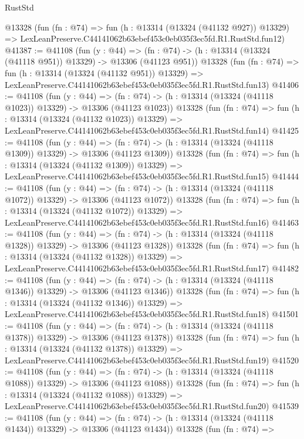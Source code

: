 \begin{lexlean}{RustStd}
\begin{coremodule}
    @13328
    (fun (fn : @74) =>
    fun (h : @13314 (@13324 (@41132 @927)) @13329) =>
    LexLeanPreserve.C44141062b63ebef453c0eb035f3ec5fd.R1.RustStd.fun12)
@41387 := @41108
    (fun (y : @44) =>
    (fn : @74) -> (h : @13314 (@13324 (@41118 @951)) @13329) -> @13306 (@41123 @951))
    @13328
    (fun (fn : @74) =>
    fun (h : @13314 (@13324 (@41132 @951)) @13329) =>
    LexLeanPreserve.C44141062b63ebef453c0eb035f3ec5fd.R1.RustStd.fun13)
@41406 := @41108
    (fun (y : @44) =>
    (fn : @74) -> (h : @13314 (@13324 (@41118 @1023)) @13329) -> @13306 (@41123 @1023))
    @13328
    (fun (fn : @74) =>
    fun (h : @13314 (@13324 (@41132 @1023)) @13329) =>
    LexLeanPreserve.C44141062b63ebef453c0eb035f3ec5fd.R1.RustStd.fun14)
@41425 := @41108
    (fun (y : @44) =>
    (fn : @74) -> (h : @13314 (@13324 (@41118 @1309)) @13329) -> @13306 (@41123 @1309))
    @13328
    (fun (fn : @74) =>
    fun (h : @13314 (@13324 (@41132 @1309)) @13329) =>
    LexLeanPreserve.C44141062b63ebef453c0eb035f3ec5fd.R1.RustStd.fun15)
@41444 := @41108
    (fun (y : @44) =>
    (fn : @74) -> (h : @13314 (@13324 (@41118 @1072)) @13329) -> @13306 (@41123 @1072))
    @13328
    (fun (fn : @74) =>
    fun (h : @13314 (@13324 (@41132 @1072)) @13329) =>
    LexLeanPreserve.C44141062b63ebef453c0eb035f3ec5fd.R1.RustStd.fun16)
@41463 := @41108
    (fun (y : @44) =>
    (fn : @74) -> (h : @13314 (@13324 (@41118 @1328)) @13329) -> @13306 (@41123 @1328))
    @13328
    (fun (fn : @74) =>
    fun (h : @13314 (@13324 (@41132 @1328)) @13329) =>
    LexLeanPreserve.C44141062b63ebef453c0eb035f3ec5fd.R1.RustStd.fun17)
@41482 := @41108
    (fun (y : @44) =>
    (fn : @74) -> (h : @13314 (@13324 (@41118 @1346)) @13329) -> @13306 (@41123 @1346))
    @13328
    (fun (fn : @74) =>
    fun (h : @13314 (@13324 (@41132 @1346)) @13329) =>
    LexLeanPreserve.C44141062b63ebef453c0eb035f3ec5fd.R1.RustStd.fun18)
@41501 := @41108
    (fun (y : @44) =>
    (fn : @74) -> (h : @13314 (@13324 (@41118 @1378)) @13329) -> @13306 (@41123 @1378))
    @13328
    (fun (fn : @74) =>
    fun (h : @13314 (@13324 (@41132 @1378)) @13329) =>
    LexLeanPreserve.C44141062b63ebef453c0eb035f3ec5fd.R1.RustStd.fun19)
@41520 := @41108
    (fun (y : @44) =>
    (fn : @74) -> (h : @13314 (@13324 (@41118 @1088)) @13329) -> @13306 (@41123 @1088))
    @13328
    (fun (fn : @74) =>
    fun (h : @13314 (@13324 (@41132 @1088)) @13329) =>
    LexLeanPreserve.C44141062b63ebef453c0eb035f3ec5fd.R1.RustStd.fun20)
@41539 := @41108
    (fun (y : @44) =>
    (fn : @74) -> (h : @13314 (@13324 (@41118 @1434)) @13329) -> @13306 (@41123 @1434))
    @13328
    (fun (fn : @74) =>

\end{coremodule}
\end{lexlean}

